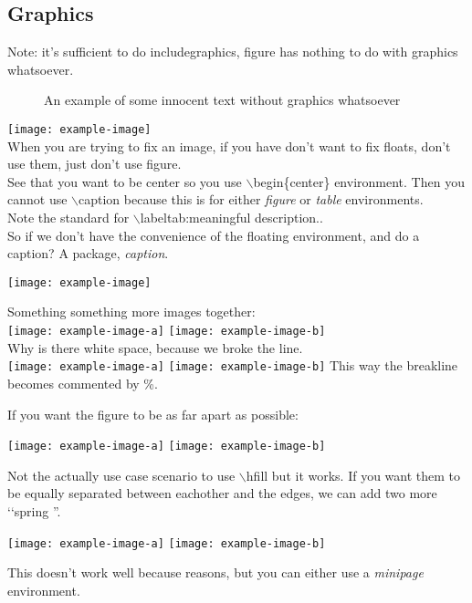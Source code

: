 \documentclass[]{report}
\begin{document}
\subsection{Graphics}
Note: it's sufficient to do includegraphics, figure has nothing to do with graphics whatsoever. \\
\begin{figure}
    An example of some innocent text without graphics whatsoever
\end{figure}
\texttt{[image: example-image]}
\\ When you are trying to fix an image, if you have don't want to fix floats, don't use them, just don't use figure.
\\ See that you want to be center so you use \(\backslash\)begin\{center\} environment. Then you cannot use \(\backslash\)caption{} because this is for either \emph{figure} or \emph{table} environments.
\\ Note the standard for \(\backslash\)label{tab:meaningful description.}.
\\ So if we don't have the convenience of the floating environment, and do a caption? A package, \emph{caption}.\\ 
\begin{center}
    \texttt{[image: example-image]}
    \label{img:ahah}
\end{center}

Something something more images together: \\

\texttt{[image: example-image-a]}
\texttt{[image: example-image-b]}
\\ Why is there white space, because we broke the line. \\
\texttt{[image: example-image-a]}%
\texttt{[image: example-image-b]}
This way the breakline becomes commented by \%.

If you want the figure to be as far apart as possible:

\begin{center}
    \texttt{[image: example-image-a]}\hfill
    \texttt{[image: example-image-b]}
\end{center}
Not the actually use case scenario to use \(\backslash\)hfill but it works.
If you want them to be equally separated between eachother and the edges, we can add two more \lq\lq spring ''.
\begin{center}
    \hfill
    \texttt{[image: example-image-a]}\hfill
    \texttt{[image: example-image-b]} \hfill
\end{center}
This doesn't work well because reasons, but you can either use a \emph{minipage} environment. \\
\end{document}
